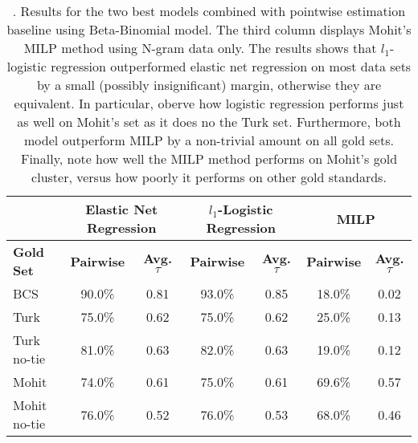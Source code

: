 \begin{table}
\small
\centering
\begin{tabular}{|l|cc|cc|cc|}
	\hline 
	& \multicolumn{2}{c|}{Elastic Net Regression } 
	& \multicolumn{2}{c|}{$l_1$-Logistic Regression} 
	& \multicolumn{2}{c|}{MILP} \\
	\hline 
	\bf Gold Set
	& \bf Pairwise & \bf Avg. $\tau$  
	& \bf Pairwise & \bf Avg. $\tau$  
	& \bf Pairwise & \bf Avg. $\tau$  \\ 
	\hline
	BCS          & 90.0\% & 0.81 & 93.0\%  &  0.85 & 18.0\%  &  0.02 \\
	Turk         & 75.0\% & 0.62 & 75.0\%  &  0.62 & 25.0\%  &  0.13 \\
	Turk no-tie  & 81.0\% & 0.63 & 82.0\%  &  0.63 & 19.0\%  &  0.12 \\
	Mohit        & 74.0\% & 0.61 & 75.0\%  &  0.61 & 69.6\%  &  0.57 \\
	Mohit no-tie & 76.0\% & 0.52 & 76.0\%  &  0.53 & 68.0\%  &  0.46 \\
	\hline
\end{tabular}
\caption{\label{font-table}. Results for the two best models combined with pointwise estimation baseline using Beta-Binomial model. The third column displays Mohit's MILP method using N-gram data only. The results shows that $l_1$-logistic regression outperformed elastic net regression on most data sets by a small (possibly insignificant) margin, otherwise they are equivalent. In particular, oberve how logistic regression performs just as well on Mohit's set as it does no the Turk set. Furthermore, both model outperform MILP by a non-trivial amount on all gold sets. Finally, note how well the MILP method performs on Mohit's gold cluster, versus how poorly it performs on other gold standards.}
\end{table}


















































